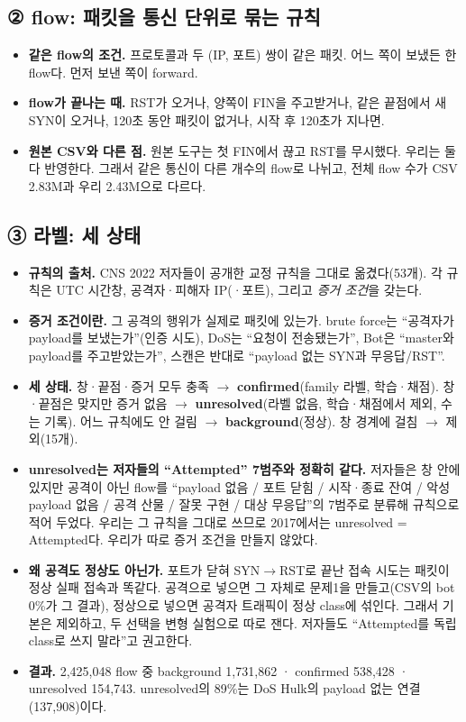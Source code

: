 \subsection{② flow: 패킷을 통신 단위로 묶는 규칙}
\begin{itemize}
\item \textbf{같은 flow의 조건.} 프로토콜과 두 (IP, 포트) 쌍이 같은 패킷. 어느 쪽이 보냈든 한 flow다. 먼저 보낸 쪽이 forward.
\item \textbf{flow가 끝나는 때.} RST가 오거나, 양쪽이 FIN을 주고받거나, 같은 끝점에서 새 SYN이 오거나, 120초 동안 패킷이 없거나, 시작 후 120초가 지나면.
\item \textbf{원본 CSV와 다른 점.} 원본 도구는 첫 FIN에서 끊고 RST를 무시했다. 우리는 둘 다 반영한다. 그래서 같은 통신이 다른 개수의 flow로 나뉘고, 전체 flow 수가 CSV 2.83M과 우리 2.43M으로 다르다.
\end{itemize}

\subsection{③ 라벨: 세 상태}
\begin{itemize}
\item \textbf{규칙의 출처.} CNS 2022 저자들이 공개한 교정 규칙을 그대로 옮겼다(53개). 각 규칙은 UTC 시간창, 공격자·피해자 IP(·포트), 그리고 \emph{증거 조건}을 갖는다.
\item \textbf{증거 조건이란.} 그 공격의 행위가 실제로 패킷에 있는가. brute force는 ``공격자가 payload를 보냈는가''(인증 시도), DoS는 ``요청이 전송됐는가'', Bot은 ``master와 payload를 주고받았는가'', 스캔은 반대로 ``payload 없는 SYN과 무응답/RST''.
\item \textbf{세 상태.} 창·끝점·증거 모두 충족 $\to$ \textbf{confirmed}(family 라벨, 학습·채점). 창·끝점은 맞지만 증거 없음 $\to$ \textbf{unresolved}(라벨 없음, 학습·채점에서 제외, 수는 기록). 어느 규칙에도 안 걸림 $\to$ \textbf{background}(정상). 창 경계에 걸침 $\to$ 제외(15개).
\item \textbf{unresolved는 저자들의 ``Attempted'' 7범주와 정확히 같다.} 저자들은 창 안에 있지만 공격이 아닌 flow를 ``payload 없음 / 포트 닫힘 / 시작·종료 잔여 / 악성 payload 없음 / 공격 산물 / 잘못 구현 / 대상 무응답''의 7범주로 분류해 규칙으로 적어 두었다. 우리는 그 규칙을 그대로 쓰므로 2017에서는 unresolved = Attempted다. 우리가 따로 증거 조건을 만들지 않았다.
\item \textbf{왜 공격도 정상도 아닌가.} 포트가 닫혀 SYN$\to$RST로 끝난 접속 시도는 패킷이 정상 실패 접속과 똑같다. 공격으로 넣으면 그 자체로 문제1을 만들고(CSV의 bot 0\%가 그 결과), 정상으로 넣으면 공격자 트래픽이 정상 class에 섞인다. 그래서 기본은 제외하고, 두 선택을 변형 실험으로 따로 잰다. 저자들도 ``Attempted를 독립 class로 쓰지 말라''고 권고한다.
\item \textbf{결과.} 2,425,048 flow 중 background 1,731,862 · confirmed 538,428 · unresolved 154,743. unresolved의 89\%는 DoS Hulk의 payload 없는 연결(137,908)이다.
\end{itemize}

